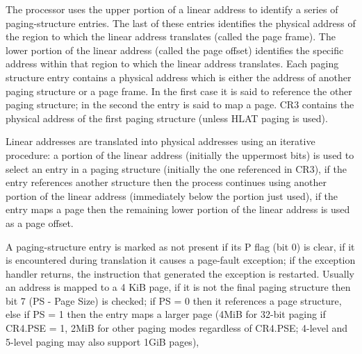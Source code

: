 \documentclass{article}
\newcommand{\layout}[1]{\parbox{\linewidth}{#1}}
\begin{document}
\layout{
  The processor uses the upper portion of a linear address to identify a series of paging-structure entries. The last of these entries identifies the physical address of the region to which the linear address translates (called the page frame). The lower portion of the linear address (called the page offset) identifies the specific address within that region to which the linear address translates.
  Each paging structure entry contains a physical address which is either the address of another paging structure or a page frame. In the first case it is said to reference the other paging structure; in the second the entry is said to map a page.
  CR3 contains the physical address of the first paging structure (unless HLAT paging is used).
} \bigskip

\layout{
  Linear addresses are translated into physical addresses using an iterative procedure:
  a portion of the linear address (initially the uppermost bits) is used to select an entry in a paging structure (initially the one referenced in CR3), if the entry references another structure then the process continues using another portion of the linear address (immediately below the portion just used), if the entry maps a page then the remaining lower portion of the linear address is used as a page offset.
} \bigskip

\layout{
  A paging-structure entry is marked as not present if its P flag (bit 0) is clear, if it is encountered during translation it causes a page-fault exception; if the exception handler returns, the instruction that generated the exception is restarted.
  Usually an address is mapped to a 4 KiB page, if it is not the final paging structure then bit 7 (PS - Page Size) is checked;
  if PS = 0 then it references a page structure, else if PS = 1 then the entry maps a larger page (4MiB for 32-bit paging if CR4.PSE = 1, 2MiB for other paging modes regardless of CR4.PSE; 4-level and 5-level paging may also support 1GiB pages),
} \bigskip

\cite[Chapter~5.2]{sdm3} \bigskip
\end{document}
